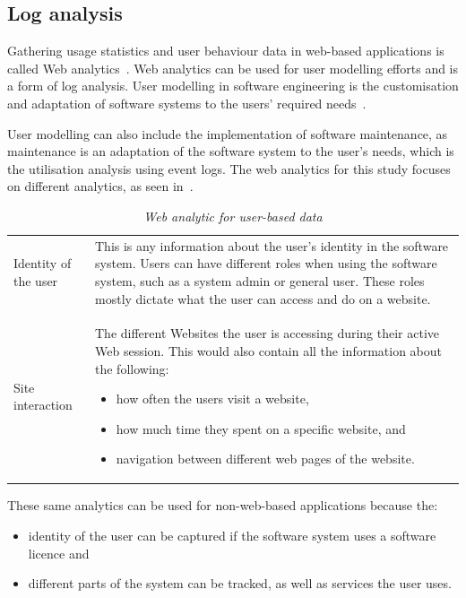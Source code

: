 \subsection{Log analysis}\label{sec:ch1_systemUtilisation}
Gathering usage statistics and user behaviour data in web-based applications is called Web analytics~\cite{Kocsis2012}. Web analytics can be used for user modelling efforts and is a form of log analysis. User modelling in software engineering is the customisation and adaptation of software systems to the users' required needs~\cite{Waqar2017, Paliouras1999}. \par User modelling can also include the implementation of software maintenance, as maintenance is an adaptation of the software system to the user's needs, which is the utilisation analysis using event logs. The web analytics for this study focuses on different analytics, as seen in~. 

\begin{table}[!htb]
	\centering
	\caption[Web analytic for user-based data]
	{\textit{Web analytic for user-based data}}
	\label{tbl:ch1_webAnalytics}
	\begin{tabularx}{\textwidth}{lX}
		\toprule 
		\thead{Analytic}  & \thead{Description} \\
		\midrule

		\rowcolor{lightgray}
		Identity of the user & This is any information about the user's identity in the software system. Users can have different roles when using the software system, such as a system admin or general user. These roles mostly dictate what the user can access and do on a website. \\

		Site interaction & The different Websites the user is accessing during their active Web session. This would also contain all the information about the following: 
		\begin{itemize}
			\item how often the users visit a website,
			\item how much time they spent on a specific website, and
			\item navigation between different web pages of the website.
		\end{itemize}
		\\
		\bottomrule
	\end{tabularx}
\end{table}

These same analytics can be used for non-web-based applications because the: 
\begin{itemize}
	\item identity of the user can be captured if the software system uses a software licence and
	\item different parts of the system can be tracked, as well as services the user uses.
\end{itemize} 

